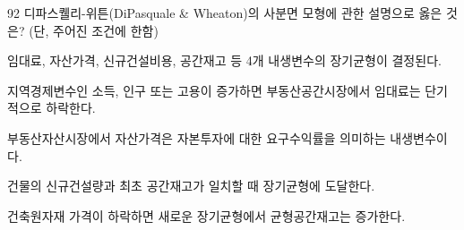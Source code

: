 \begin{question}{92}
디파스퀠리-위튼(DiPasquale \& Wheaton)의 사분면 모형에 관한 설명으로 옳은 것은? (단, 주어진 조건에 한함)
\begin{choices}
  \item 임대료, 자산가격, 신규건설비용, 공간재고 등 4개 내생변수의 장기균형이 결정된다.
  \item 지역경제변수인 소득, 인구 또는 고용이 증가하면 부동산공간시장에서 임대료는 단기적으로 하락한다.
  \item 부동산자산시장에서 자산가격은 자본투자에 대한 요구수익률을 의미하는 내생변수이다.
  \item 건물의 신규건설량과 최초 공간재고가 일치할 때 장기균형에 도달한다.
  \item 건축원자재 가격이 하락하면 새로운 장기균형에서 균형공간재고는 증가한다.
\end{choices}
\end{question}

